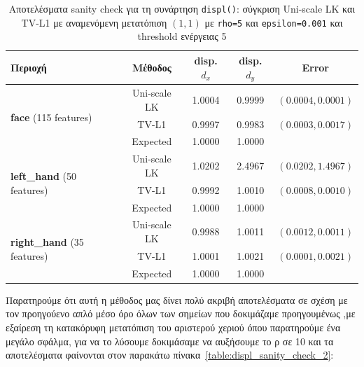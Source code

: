 \documentclass[12pt, a4paper]{article}
\begin{document}
\begin{table}[H]
\centering
\setlength{\tabcolsep}{6pt}
\begin{tabular}{lcccc}
\toprule
\textbf{Περιοχή} & \textbf{Μέθοδος} & \textbf{disp. $d_x$} & \textbf{disp. $d_y$} & \textbf{Error} \\
\midrule
\multirow{3}{*}{\textbf{face} (115 features)} & Uni-scale LK & 1.0004 & 0.9999 & $(0.0004, 0.0001)$ \\
 & TV-L1 & 0.9997 & 0.9983 & $(0.0003, 0.0017)$ \\
 & Expected & 1.0000 & 1.0000 & \\
\midrule
\multirow{3}{*}{\textbf{left\_hand} (50 features)} & Uni-scale LK & 1.0202 & 2.4967 & $(0.0202, 1.4967)$ \\
 & TV-L1 & 0.9992 & 1.0010 & $(0.0008, 0.0010)$ \\
 & Expected & 1.0000 & 1.0000 & \\
\midrule
\multirow{3}{*}{\textbf{right\_hand} (35 features)} & Uni-scale LK & 0.9988 & 1.0011 & $(0.0012, 0.0011)$ \\
 & TV-L1 & 1.0001 & 1.0021 & $(0.0001, 0.0021)$ \\
 & Expected & 1.0000 & 1.0000 & \\
\bottomrule
\end{tabular}
\caption{Αποτελέσματα sanity check για τη συνάρτηση \texttt{displ()}: σύγκριση Uni-scale LK και TV-L1 με αναμενόμενη μετατόπιση $(1, 1)$ με \texttt{rho=5} και \texttt{epsilon=0.001} και threshold ενέργειας 5}
\label{table:displ_sanity_check}
\end{table}
Παρατηρούμε ότι αυτή η μέθοδος μας δίνει πολύ ακριβή αποτελέσματα σε σχέση με τον προηγούενο απλό μέσο όρο όλων των σημείων που δοκιμάζαμε προηγουμένως ,με εξαίρεση τη κατακόρυφη μετατόπιση του αριστερού χεριού όπου παρατηρούμε ένα μεγάλο σφάλμα, για να το λύσουμε δοκιμάσαμε να αυξήσουμε το ρ σε 10 και τα αποτελέσματα φαίνονται στον παρακάτω πίνακα~\ref{table:displ_sanity_check_2}: 
\end{document}
